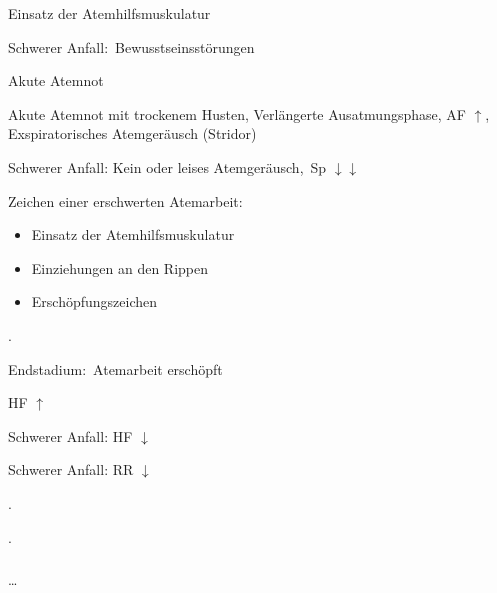 \documentclass[
ngerman,
paper=a4,
asymmetric,
fontsize=10pt,
draft=false,
numbers=noenddot,
bibtotocnumbered,
footnotes=multiple,
]{scrreprt}
\newcommand{\jALT}{\vspace{6pt}\noindent{\color{red}\sffamily\textbf{DELETED}\hrulefill\newline}}
\newcommand{\jALTende}{\newline{\color{red}\rule{\linewidth}{2pt}\newline}}
\newcommand{\jNEU}{\vspace{6pt}\noindent{\color{green}\sffamily\textbf{ADDED}\hrulefill\newline}}
\newcommand{\jNEUende}{\newline{\color{green}\rule{\linewidth}{3pt}\newline}}
\newcommand{\RedFlag}{{\color{DefaultRed}\scriptsize{\VarFlag}\hspace{-0.5em}}}
\begin{document}
 {
 \begin{ABCDESlide}
  \item[\ABCDE{1}] 
   \item[\ABCDE{2}] Einsatz der Atemhilfsmuskulatur
   \item[\ABCDE{3}] Schwerer Anfall:
   {\RedFlag}\,Bewusstseinsstörungen
   \item[\ABCDE{4}] Akute Atemnot
   \item[\ABCDE{B}] Akute Atemnot mit trockenem
   Husten, Verlängerte Ausatmungsphase, AF $\uparrow$,
   Exspiratorisches Atemgeräusch (Stridor)
   
   Schwerer Anfall: Kein oder leises Atemgeräusch,
   {\RedFlag}\,Sp $\downarrow\downarrow$

\jNEU
  {Zeichen einer erschwerten Atemarbeit}:
  \begin{itemize}
    \item Einsatz der Atemhilfsmuskulatur
    \item Einziehungen an den Rippen
    \item Erschöpfungszeichen
  \end{itemize}
  .
  \jNEUende
  
   Endstadium: {\RedFlag}\,Atemarbeit erschöpft
   \item[\ABCDE{C}] HF $\uparrow$
   
   Schwerer Anfall: HF $\downarrow$
   \item[\ABCDE{D}] 
   Schwerer Anfall: RR $\downarrow$
  \item[\ABCDE{=}] 
 \end{ABCDESlide}
 }{}{}{}
 .
 
 \jALT
 .
 \subparagraph{}
 \ldots
 \jALTende
 
\end{document}
